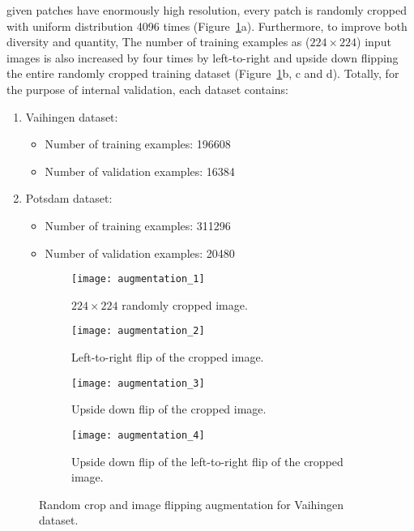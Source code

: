given patches have enormously high resolution, every patch is randomly cropped
with uniform distribution 4096 times (Figure~\ref{fig:data_augmentation}a).
Furthermore, to improve both diversity and quantity, The number of training
examples as ($224 \times 224$) input images is also increased by four times by
left-to-right and upside down flipping the entire randomly cropped training
dataset (Figure~\ref{fig:data_augmentation}b, c and d). Totally, for the purpose
of internal validation, each dataset contains:
\begin{enumerate}
    \item Vaihingen dataset:
    \begin{itemize}
        \item Number of training examples: 196608
        \item Number of validation examples: 16384
    \end{itemize}
    \item Potsdam dataset:
    \begin{itemize}
        \item Number of training examples: 311296
        \item Number of validation examples: 20480
    \end{itemize}
\end{enumerate}
\begin{figure}[h]
    \centering
    \begin{subfigure}[b]{0.37125\linewidth}
        \centering
        \texttt{[image: augmentation\_1]}
        \caption{$224 \times 224$ randomly cropped image.}
    \end{subfigure}\hspace{1cm}\vspace{0.5cm}
    \begin{subfigure}[b]{0.37125\linewidth}
        \centering
        \texttt{[image: augmentation\_2]}
        \caption{Left-to-right flip of the cropped image.}
    \end{subfigure}
    \begin{subfigure}[b]{0.37125\linewidth}
        \centering
        \texttt{[image: augmentation\_3]}
        \caption{Upside down flip of the cropped image.}
    \end{subfigure}\hspace{1cm}\vspace{0.5cm}
    \begin{subfigure}[b]{0.37125\linewidth}
        \centering
        \texttt{[image: augmentation\_4]}
        \caption{Upside down flip of the left-to-right flip of the cropped
        image.}
    \end{subfigure}
    \caption{Random crop and image flipping augmentation for Vaihingen
    dataset.}
    \label{fig:data_augmentation}
\end{figure}


